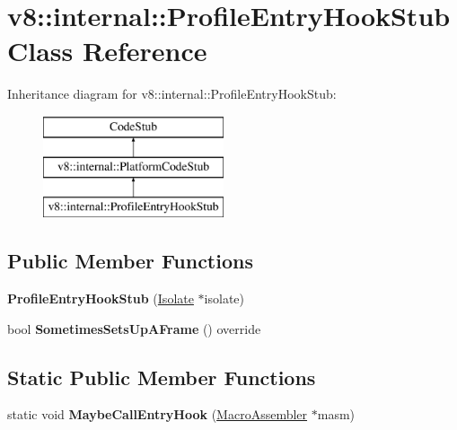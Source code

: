 \hypertarget{classv8_1_1internal_1_1_profile_entry_hook_stub}{}\section{v8\+:\+:internal\+:\+:Profile\+Entry\+Hook\+Stub Class Reference}
\label{classv8_1_1internal_1_1_profile_entry_hook_stub}
Inheritance diagram for v8\+:\+:internal\+:\+:Profile\+Entry\+Hook\+Stub\+:\begin{figure}[H]
\begin{center}
\leavevmode
\includegraphics[height=3.000000cm]{classv8_1_1internal_1_1_profile_entry_hook_stub}
\end{center}
\end{figure}
\subsection*{Public Member Functions}
\begin{DoxyCompactItemize}
\item 
{\bfseries Profile\+Entry\+Hook\+Stub} (\hyperlink{classv8_1_1internal_1_1_isolate}{Isolate} $\ast$isolate)\hypertarget{classv8_1_1internal_1_1_profile_entry_hook_stub_a3f69babf602c7b965d7217fee802181d}{}\label{classv8_1_1internal_1_1_profile_entry_hook_stub_a3f69babf602c7b965d7217fee802181d}

\item 
bool {\bfseries Sometimes\+Sets\+Up\+A\+Frame} () override\hypertarget{classv8_1_1internal_1_1_profile_entry_hook_stub_a1a52ba1ec7d31f014f140e1e9387127b}{}\label{classv8_1_1internal_1_1_profile_entry_hook_stub_a1a52ba1ec7d31f014f140e1e9387127b}

\end{DoxyCompactItemize}
\subsection*{Static Public Member Functions}
\begin{DoxyCompactItemize}
\item 
static void {\bfseries Maybe\+Call\+Entry\+Hook} (\hyperlink{classv8_1_1internal_1_1_macro_assembler}{Macro\+Assembler} $\ast$masm)\hypertarget{classv8_1_1internal_1_1_profile_entry_hook_stub_a6bdfae96a00578e973227336f910d6b0}{}\label{classv8_1_1internal_1_1_profile_entry_hook_stub_a6bdfae96a00578e973227336f910d6b0}

\end{DoxyCompactItemize}
